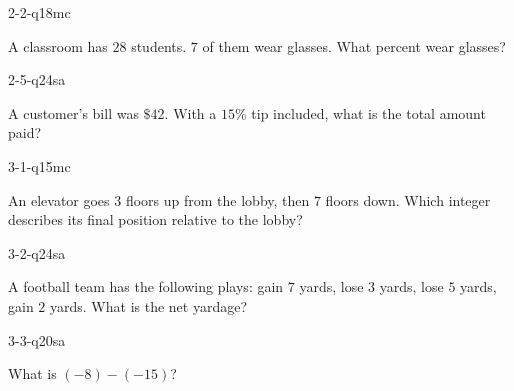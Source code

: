 \begin{practiceQuestion}{2-2-q18}{mc}
\begin{questionText}
A classroom has $28$ students. $7$ of them wear glasses. What percent wear glasses?
\end{questionText}
\end{practiceQuestion}

\begin{practiceQuestion}{2-5-q24}{sa}
\begin{questionText}
A customer's bill was $\$42$. With a $15\%$ tip included, what is the total amount paid?
\end{questionText}
\end{practiceQuestion}

\begin{practiceQuestion}{3-1-q15}{mc}
\begin{questionText}
An elevator goes $3$ floors up from the lobby, then $7$ floors down. Which integer describes its final position relative to the lobby?
\end{questionText}
\end{practiceQuestion}

\begin{practiceQuestion}{3-2-q24}{sa}
\begin{questionText}
A football team has the following plays: gain $7$ yards, lose $3$ yards, lose $5$ yards, gain $2$ yards. What is the net yardage?
\end{questionText}
\end{practiceQuestion}

\begin{practiceQuestion}{3-3-q20}{sa}
\begin{questionText}
What is $(-8) - (-15)$?
\end{questionText}
\end{practiceQuestion}

